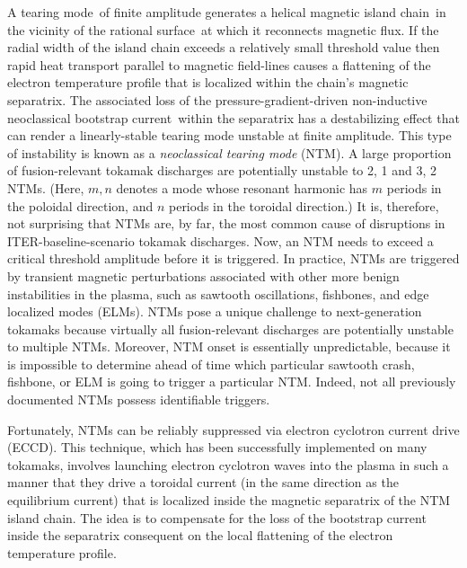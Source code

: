 \documentclass[12pt,prb,aps]{revtex4-1}
\begin{document}
A tearing mode\,\cite{tear1} of finite amplitude generates a helical magnetic island chain\,\cite{ntm1} in the vicinity of the rational surface\,\cite{ideal3} at which it reconnects magnetic flux.
If the radial width of the island chain exceeds a relatively small threshold value then rapid  heat transport parallel to magnetic field-lines causes a flattening of the  electron temperature profile
that is localized within the chain's magnetic separatrix.\cite{ntm2} The associated loss of the pressure-gradient-driven non-inductive neoclassical bootstrap current\,\cite{ntm3} within the separatrix
has a destabilizing effect that can render a linearly-stable tearing mode unstable at finite amplitude. This type of instability is known as a {\em neoclassical tearing mode}\/  (NTM).\cite{tftr,ntm4c,ntm4b,ntm4a}  A large proportion of fusion-relevant tokamak
discharges are potentially unstable  to 2, 1 and 3, 2 NTMs.\cite{ntm4,ntm5}  (Here, $m, n$ denotes a mode whose resonant harmonic has $m$ periods in the poloidal
direction, and $n$ periods in the toroidal direction.) It is, therefore, not  surprising that NTMs are, by far, the most common cause of disruptions in ITER-baseline-scenario tokamak
discharges.\cite{iter,ntm4,ntm5,vries}
Now, an NTM needs to exceed a critical  threshold amplitude
before it is triggered. In practice, NTMs are
triggered by transient magnetic perturbations associated with other more benign instabilities in the plasma, such as sawtooth oscillations, fishbones, and
edge localized modes (ELMs).\cite{ntm4,ntm5,sawtooth,elm} NTMs pose a unique challenge to next-generation tokamaks  because  virtually all fusion-relevant discharges 
are potentially unstable to multiple NTMs. Moreover, NTM onset is essentially unpredictable, because it
is impossible to determine ahead of time which particular sawtooth crash, fishbone, or ELM is going to trigger a particular NTM.\cite{nstx} Indeed, not all previously documented NTMs possess identifiable
triggers.\cite{ntm6} 

Fortunately, NTMs can be reliably suppressed via electron cyclotron current drive (ECCD).\cite{zohm,prater} This technique, which has been
successfully implemented on many tokamaks,\cite{eccd1,eccd2,eccd3,eccd3a,eccd3b,eccd4,eccd5} involves
launching electron cyclotron waves into the plasma in such a manner that they drive a toroidal current (in the same direction as the equilibrium current) that is 
localized  inside the magnetic separatrix of
the NTM island chain. The idea is to compensate for the loss of the bootstrap current inside the separatrix consequent on the local flattening
of the electron temperature profile.\cite{ntm4,ntm5} 
\end{document}
